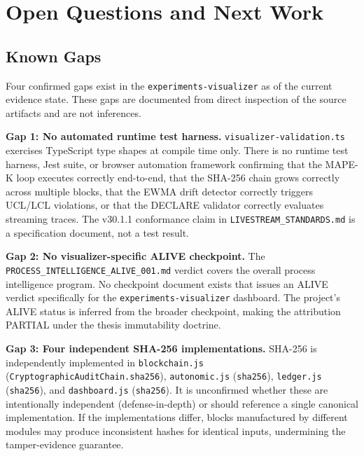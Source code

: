 
\section{Open Questions and Next Work}
\label{sec:experiments-visualizer-openq}

\subsection{Known Gaps}
\label{sec:experiments-visualizer-openq-gaps}

Four confirmed gaps exist in the \texttt{experiments-visualizer} as of the current evidence
state. These gaps are documented from direct inspection of the source artifacts and are not
inferences.

\textbf{Gap 1: No automated runtime test harness.}
\texttt{visualizer-validation.ts} exercises TypeScript type shapes at compile time only. There
is no runtime test harness, Jest suite, or browser automation framework confirming that the
MAPE-K loop executes correctly end-to-end, that the SHA-256 chain grows correctly across
multiple blocks, that the EWMA drift detector correctly triggers UCL/LCL violations, or that
the DECLARE validator correctly evaluates streaming traces. The v30.1.1 conformance claim in
\texttt{LIVESTREAM\_STANDARDS.md} is a specification document, not a test result.

\textbf{Gap 2: No visualizer-specific ALIVE checkpoint.}
The \texttt{PROCESS\_INTELLIGENCE\_ALIVE\_001.md} verdict covers the overall process
intelligence program. No checkpoint document exists that issues an ALIVE verdict specifically
for the \texttt{experiments-visualizer} dashboard. The project's ALIVE status is inferred
from the broader checkpoint, making the attribution PARTIAL under the thesis immutability
doctrine.

\textbf{Gap 3: Four independent SHA-256 implementations.}
SHA-256 is independently implemented in \texttt{blockchain.js}
(\texttt{CryptographicAuditChain.sha256}), \texttt{autonomic.js} (\texttt{sha256}),
\texttt{ledger.js} (\texttt{sha256}), and \texttt{dashboard.js} (\texttt{sha256}). It is
unconfirmed whether these are intentionally independent (defense-in-depth) or should reference
a single canonical implementation. If the implementations differ, blocks manufactured by
different modules may produce inconsistent hashes for identical inputs, undermining the
tamper-evidence guarantee.

